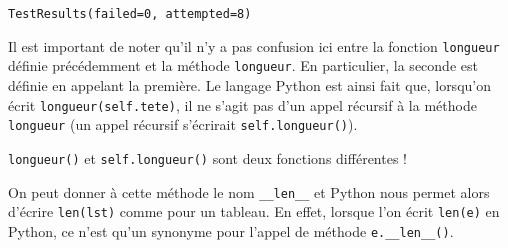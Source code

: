 \documentclass[a4paper,17pt]{extarticle}
\makeatletter
\newcommand{\boxspacing}{\kern\kvtcb@left@rule\kern\kvtcb@boxsep}
\newcommand{\prompt}[4]{
        \ttfamily\llap{{\color{#2}[#3]:\hspace{3pt}#4}}\vspace{-\baselineskip}
    }
\makeatother
\begin{document}
            \begin{tcolorbox}[breakable, size=fbox, boxrule=.5pt, pad at break*=1mm, opacityfill=0]
\prompt{Out}{outcolor}{6}{\boxspacing}
\begin{Verbatim}[commandchars=\\\{\}]
TestResults(failed=0, attempted=8)
\end{Verbatim}
\end{tcolorbox}
        \begin{remarque}
    Il est important de noter qu'il n'y a pas confusion ici entre la
fonction \texttt{longueur} définie précédemment et la méthode
\texttt{longueur}. En particulier, la seconde est définie en appelant la
première. Le langage Python est ainsi fait que, lorsqu'on écrit
\texttt{longueur(self.tete)}, il ne s'agit pas d'un appel récursif à la
méthode \texttt{longueur} (un appel récursif s'écrirait
\texttt{self.longueur()}).

\texttt{longueur()} et \texttt{self.longueur()} sont deux fonctions
différentes !

        \end{remarque}
    On peut donner à cette méthode le nom \texttt{\_\_len\_\_} et Python
nous permet alors d'écrire \texttt{len(lst)} comme pour un tableau. En
effet, lorsque l'on écrit \texttt{len(e)} en Python, ce n'est qu'un
synonyme pour l'appel de méthode \texttt{e.\_\_len\_\_()}.
\end{document}
